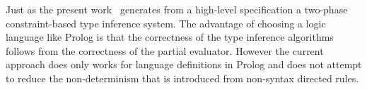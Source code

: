 Just as the present work~\cite{tomb2005automatic} generates from a
high-level specification a two-phase constraint-based type inference
system. The advantage of choosing a logic language like Prolog is that
the correctness of the type inference algorithms follows from the
correctness of the partial evaluator. However the current approach
does only works for language definitions in Prolog and does not
attempt to reduce the non-determinism that is introduced from
non-syntax directed rules.

